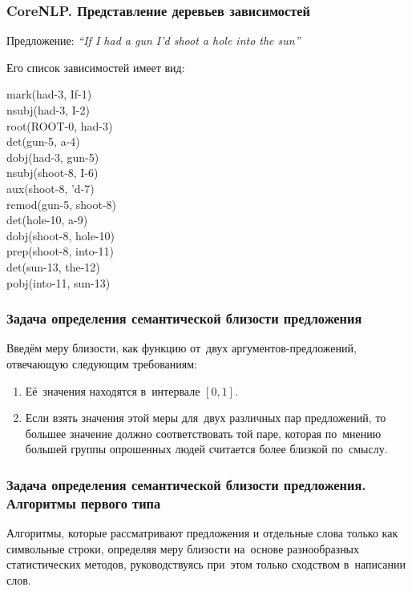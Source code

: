 \documentclass{beamer}
\begin{document}
\begin{frame}
\frametitle{CoreNLP. Представление деревьев зависимостей}
Предложение: {\it ``If I had a gun I'd shoot a hole into the sun''}

Его список зависимостей имеет вид:

\begin{center}

mark(had-3, If-1)\\
nsubj(had-3, I-2)\\
root(ROOT-0, had-3)\\
det(gun-5, a-4)\\
dobj(had-3, gun-5)\\
nsubj(shoot-8, I-6)\\
aux(shoot-8, 'd-7)\\
rcmod(gun-5, shoot-8)\\
det(hole-10, a-9)\\
dobj(shoot-8, hole-10)\\
prep(shoot-8, into-11)\\
det(sun-13, the-12)\\
pobj(into-11, sun-13)\\

\end{center}

\end{frame}

\begin{frame}
\frametitle{Задача определения семантической близости предложения}

Введём меру близости, как функцию от~двух аргументов-предложений, отвечающую следующим требованиям:

\begin{enumerate}

\item {
Её~значения находятся в~интервале $[0,1]$.
}

\item {
Если взять значения этой меры для~двух различных пар предложений, 
то большее значение должно соответствовать той паре, которая по~мнению большей группы опрошенных людей считается более близкой по~смыслу.
}

\end{enumerate}
\end{frame}

\begin{frame}
\frametitle{Задача определения семантической близости предложения. Алгоритмы первого типа}

Алгоритмы, которые рассматривают предложения и отдельные слова только как символьные строки, 
определяя меру близости на~основе разнообразных статистических методов, 
руководствуясь при~этом только сходством в~написании слов.

\end{frame}
\end{document}
